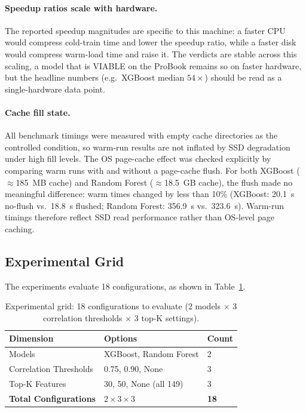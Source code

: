 \paragraph{Speedup ratios scale with hardware.}
The reported speedup magnitudes are specific to this machine: a faster CPU
would compress cold-train time and lower the speedup ratio, while a faster
disk would compress warm-load time and raise it. The verdicts are stable
across this scaling, a model that is VIABLE on the ProBook remains so on
faster hardware, but the headline numbers (e.g.\ XGBoost median
$54\times$) should be read as a single-hardware data point.

\paragraph{Cache fill state.}
All benchmark timings were measured with empty cache directories as the
controlled condition, so warm-run results are not inflated by SSD
degradation under high fill levels. The OS page-cache effect was checked
explicitly by comparing warm runs with and without a page-cache flush. For
both XGBoost ($\approx$185~MB cache) and Random Forest ($\approx$18.5~GB
cache), the flush made no meaningful difference: warm times changed by
less than 10\% (XGBoost: 20.1~s no-flush vs.\ 18.8~s flushed; Random
Forest: 356.9~s vs.\ 323.6~s). Warm-run timings therefore reflect SSD read
performance rather than OS-level page caching.

\subsection{Experimental Grid}

The experiments evaluate 18 configurations, as shown in Table~\ref{tab:exp_grid}.

\begin{table}[ht]
\centering
\begin{tabular}{lll}
\toprule
\textbf{Dimension} & \textbf{Options} & \textbf{Count} \\
\midrule
Models & XGBoost, Random Forest & 2 \\
Correlation Thresholds & 0.75, 0.90, None & 3 \\
Top-K Features & 30, 50, None (all 149) & 3 \\
\midrule
\textbf{Total Configurations} & $2 \times 3 \times 3$ & \textbf{18} \\
\bottomrule
\end{tabular}
\caption[Experimental grid: 18 configurations]{Experimental grid: 18 configurations to evaluate (2 models $\times$ 3 correlation thresholds $\times$ 3 top-K settings).}
\label{tab:exp_grid}
\end{table}

